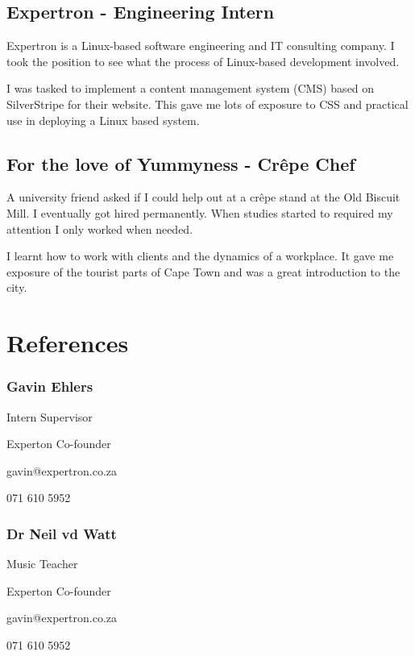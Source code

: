 \documentclass[8pt]{extarticle}
\begin{document}
\begin{multicols}{2}
\subsection{Expertron - Engineering Intern}

Expertron is a Linux-based software engineering and IT
consulting company. I took the position to see what the
process of Linux-based development involved.

I was tasked to implement a content management system
(CMS) based on SilverStripe for their website. This gave me
lots of exposure to CSS and practical use in deploying a
Linux based system.

\subsection{For the love of Yummyness - Crêpe Chef}

A university friend asked if I could help out at a crêpe stand
at the Old Biscuit Mill. I eventually got hired permanently.
When studies started to required my attention I only worked
when needed.

I learnt how to work with clients and the dynamics of a
workplace. It gave me exposure of the tourist parts of Cape
Town and was a great introduction to the city.

\section{References}

\subsubsection{Gavin Ehlers}

Intern Supervisor
\begin{description}
	\setlength\itemsep{-1mm}
	\item Experton Co-founder
	\item gavin@expertron.co.za
	\item 071 610 5952
\end{description}

\subsubsection{Dr Neil vd Watt}

Music Teacher
\begin{description}
	\setlength\itemsep{-1mm}
	\item Experton Co-founder
	\item gavin@expertron.co.za
	\item 071 610 5952
\end{description}


\end{multicols}
\end{document}
